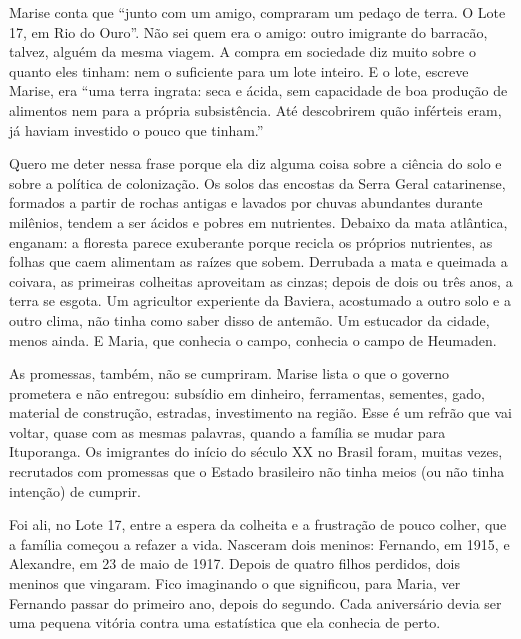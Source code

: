 \documentclass[
  brazilian,
  11pt,
  openany]{book}
\begin{document}
Marise conta que ``junto com um amigo, compraram um pedaço de terra. O
Lote 17, em Rio do Ouro''. Não sei quem era o amigo: outro imigrante do
barracão, talvez, alguém da mesma viagem. A compra em sociedade diz
muito sobre o quanto eles tinham: nem o suficiente para um lote inteiro.
E o lote, escreve Marise, era ``uma terra ingrata: seca e ácida, sem
capacidade de boa produção de alimentos nem para a própria subsistência.
Até descobrirem quão inférteis eram, já haviam investido o pouco que
tinham.''

Quero me deter nessa frase porque ela diz alguma coisa sobre a ciência
do solo e sobre a política de colonização. Os solos das encostas da
Serra Geral catarinense, formados a partir de rochas antigas e lavados
por chuvas abundantes durante milênios, tendem a ser ácidos e pobres em
nutrientes. Debaixo da mata atlântica, enganam: a floresta parece
exuberante porque recicla os próprios nutrientes, as folhas que caem
alimentam as raízes que sobem. Derrubada a mata e queimada a coivara, as
primeiras colheitas aproveitam as cinzas; depois de dois ou três anos, a
terra se esgota. Um agricultor experiente da Baviera, acostumado a outro
solo e a outro clima, não tinha como saber disso de antemão. Um
estucador da cidade, menos ainda. E Maria, que conhecia o campo,
conhecia o campo de Heumaden.

As promessas, também, não se cumpriram. Marise lista o que o governo
prometera e não entregou: subsídio em dinheiro, ferramentas, sementes,
gado, material de construção, estradas, investimento na região. Esse é
um refrão que vai voltar, quase com as mesmas palavras, quando a família
se mudar para Ituporanga. Os imigrantes do início do século XX no Brasil
foram, muitas vezes, recrutados com promessas que o Estado brasileiro
não tinha meios (ou não tinha intenção) de cumprir.

Foi ali, no Lote 17, entre a espera da colheita e a frustração de pouco
colher, que a família começou a refazer a vida. Nasceram dois meninos:
Fernando, em 1915, e Alexandre, em 23 de maio de 1917. Depois de quatro
filhos perdidos, dois meninos que vingaram. Fico imaginando o que
significou, para Maria, ver Fernando passar do primeiro ano, depois do
segundo. Cada aniversário devia ser uma pequena vitória contra uma
estatística que ela conhecia de perto.
\end{document}
